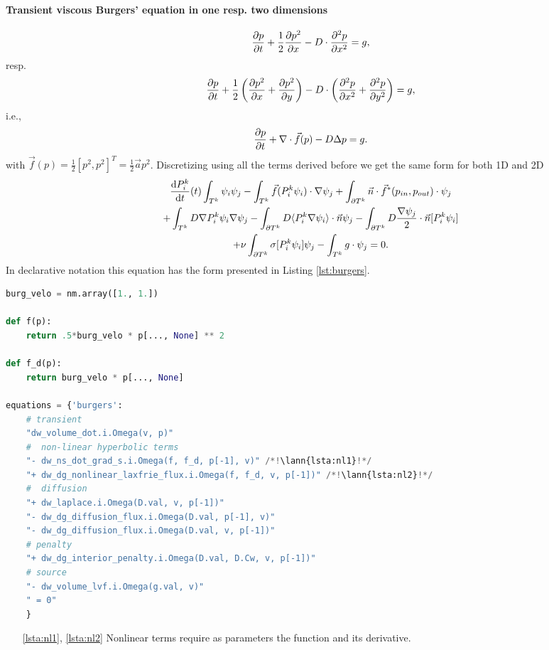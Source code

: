 \paragraph{Transient viscous Burgers' equation in one resp. two dimensions}
\begin{equation}
\frac{\partial p}{\partial t} + \frac{1}{2}\frac{\partial p^2}{\partial x} - D \cdot\frac{\partial^2 p}{\partial x^2} = g,
\end{equation}
resp.
\begin{equation}
\label{eq:ex_burgers}
    \frac{\partial p}{\partial t} + \frac{1}{2}\left(\frac{\partial p^2}{\partial x} + \frac{\partial p^2}{\partial y}\right)  -
    D \cdot \left( \frac{\partial^2 p}{\partial x^2} + \frac{\partial^2 p}{\partial y^2} \right)
    = g,
\end{equation}
i.e.,
\begin{equation}
    \frac{\partial p}{\partial t} + \nabla \cdot \vec{f}(p) - D\Delta p = g.
\end{equation}
with $\vec{f}(p) = \frac{1}{2}[p^2, p^2]^T = \frac{1}{2}\vec{a} p^2$.
Discretizing using all the terms derived before we get the same form for both 1D and 2D
\begin{multline}
    \frac{\text{d}P^k_i}{\text{d}t}(t)\int_{T^k}\psi_i\psi_j
    - \int_{T^k} \vec{f}(P_i^k\psi_i)\cdot\nabla\psi_j
    + \int_{\partial{T^k}} \vec{n} \cdot \vec{f}^{*} (p_{in}, p_{out})\cdot\psi_j\\
    + \int_{T^k} D\nabla P^k_i\psi_i \nabla \psi_j
    - \int_{\partial T^k} D \langle P^k_i\nabla\psi_i\rangle \cdot \vec{n}\psi_j
    - \int_{\partial T^k} D \frac{\nabla \psi_j}{2}\cdot \vec{n} [P^k_i\psi_i] \\
    + \nu \int_{\partial T^k} \sigma [P^k_i\psi_i]\psi_j
    - \int_{T^k} g\cdot \psi_j
    = 0.
\end{multline}
In \sfepy{} declarative notation this equation has the form presented in
Listing \ref{lst:burgers}.
\setcounter{lstannotation}{0}
\begin{lstlisting}[language=Python, caption=Viscous Burgers' equation \label{lst:burgers}]
burg_velo = nm.array([1., 1.])

def f(p):
    return .5*burg_velo * p[..., None] ** 2

def f_d(p):
    return burg_velo * p[..., None]

equations = {'burgers':
    # transient
    "dw_volume_dot.i.Omega(v, p)"
    #  non-linear hyperbolic terms
    "- dw_ns_dot_grad_s.i.Omega(f, f_d, p[-1], v)" /*!\lann{lsta:nl1}!*/
    "+ dw_dg_nonlinear_laxfrie_flux.i.Omega(f, f_d, v, p[-1])" /*!\lann{lsta:nl2}!*/
    #  diffusion
    "+ dw_laplace.i.Omega(D.val, v, p[-1])"
    "- dw_dg_diffusion_flux.i.Omega(D.val, p[-1], v)"
    "- dw_dg_diffusion_flux.i.Omega(D.val, v, p[-1])"
    # penalty
    "+ dw_dg_interior_penalty.i.Omega(D.val, D.Cw, v, p[-1])"
    # source
    "- dw_volume_lvf.i.Omega(g.val, v)"
    " = 0"
    }
\end{lstlisting}
\begin{itemize}
    \item[\ref{lsta:nl1}, \ref{lsta:nl2}] Nonlinear terms require as parameters the function
    and its derivative.
\end{itemize}


